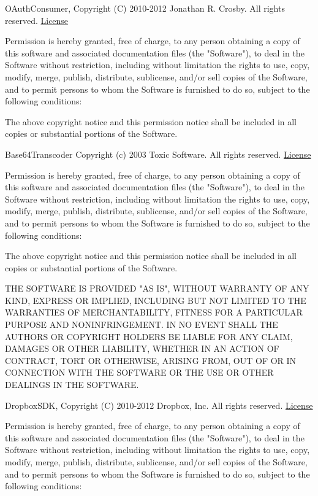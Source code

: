 \documentclass{tufte-book}
\newcommand{\licensetext}{\scriptsize \setlength{\parskip}{0mm} \singlespacing}
\begin{document}
\begin{fullwidth}
OAuthConsumer, Copyright (C) 2010-2012 Jonathan R. Crosby. All rights reserved. \href{http://www.opensource.org/licenses/mit-license.php}{License}

{\licensetext Permission is hereby granted, free of charge, to any person obtaining a copy of this software and associated documentation files (the "Software"), to deal in the Software without restriction, including without limitation the rights to use, copy, modify, merge, publish, distribute, sublicense, and/or sell copies of the Software, and to permit persons to whom the Software is furnished to do so, subject to the following conditions:

The above copyright notice and this permission notice shall be included in all copies or substantial portions of the Software.}

Base64Transcoder Copyright (c) 2003 Toxic Software. All rights reserved. \href{http://www.opensource.org/licenses/mit-license.php}{License}

{\licensetext Permission is hereby granted, free of charge, to any person obtaining a copy
of this software and associated documentation files (the "Software"), to deal
in the Software without restriction, including without limitation the rights
to use, copy, modify, merge, publish, distribute, sublicense, and/or sell
copies of the Software, and to permit persons to whom the Software is
furnished to do so, subject to the following conditions:

The above copyright notice and this permission notice shall be included in
all copies or substantial portions of the Software.

THE SOFTWARE IS PROVIDED "AS IS", WITHOUT WARRANTY OF ANY KIND, EXPRESS OR
IMPLIED, INCLUDING BUT NOT LIMITED TO THE WARRANTIES OF MERCHANTABILITY,
FITNESS FOR A PARTICULAR PURPOSE AND NONINFRINGEMENT. IN NO EVENT SHALL THE
AUTHORS OR COPYRIGHT HOLDERS BE LIABLE FOR ANY CLAIM, DAMAGES OR OTHER
LIABILITY, WHETHER IN AN ACTION OF CONTRACT, TORT OR OTHERWISE, ARISING FROM,
OUT OF OR IN CONNECTION WITH THE SOFTWARE OR THE USE OR OTHER DEALINGS IN
THE SOFTWARE.}

DropboxSDK, Copyright (C) 2010-2012 Dropbox, Inc. All rights reserved. \href{http://www.opensource.org/licenses/mit-license.php}{License}

{\licensetext Permission is hereby granted, free of charge, to any person obtaining a copy of this software and associated documentation files (the "Software"), to deal in the Software without restriction, including without limitation the rights to use, copy, modify, merge, publish, distribute, sublicense, and/or sell copies of the Software, and to permit persons to whom the Software is furnished to do so, subject to the following conditions:

}
\end{fullwidth}
\end{document}
